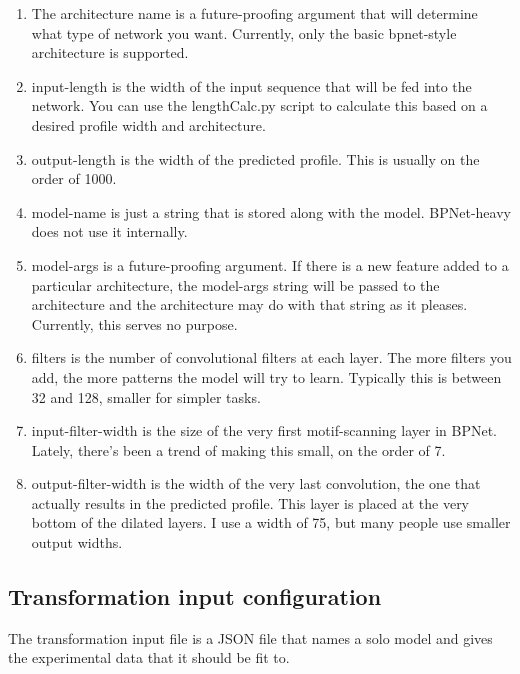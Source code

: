 \documentclass{article}
\begin{document}
\begin{enumerate}
    \item The architecture name is a future-proofing argument that will determine what type of network you want. Currently, only the basic bpnet-style architecture is supported. 
    \item input-length is the width of the input sequence that will be fed into the network. You can use the lengthCalc.py script to calculate this based on a desired profile width and architecture.
    \item output-length is the width of the predicted profile. This is usually on the order of 1000.
    \item model-name is just a string that is stored along with the model. BPNet-heavy does not use it internally.
    \item model-args is a future-proofing argument. If there is a new feature added to a particular architecture, the model-args string will be passed to the architecture and the architecture may do with that string as it pleases. Currently, this serves no purpose. 
    \item filters is the number of convolutional filters at each layer. The more filters you add, the more patterns the model will try to learn. Typically this is between 32 and 128, smaller for simpler tasks. 
    \item input-filter-width is the size of the very first motif-scanning layer in BPNet. Lately, there's been a trend of making this small, on the order of 7. 
    \item output-filter-width is the width of the very last convolution, the one that actually results in the predicted profile. This layer is placed at the very bottom of the dilated layers. I use a width of 75, but many people use smaller output widths. 
\end{enumerate}

\subsection{Transformation input configuration}
The transformation input file is a JSON file that names a solo model and gives the experimental data that it should be fit to. 
\end{document}
